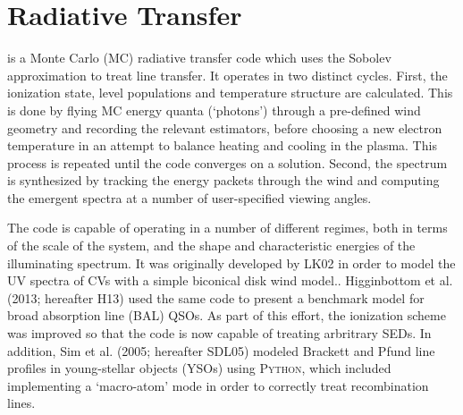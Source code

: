 \documentclass[preprint, a4paper, 11pt]{aastex}
\begin{document}









%
%

\section{Radiative Transfer}

\py is a Monte Carlo (MC) radiative transfer code which uses
the Sobolev approximation to treat line transfer. It operates 
in two distinct cycles. First, the ionization state, level populations
and temperature structure are calculated. This is done by
flying MC energy quanta (`photons') through a pre-defined wind geometry and recording
the relevant estimators, before choosing  a new electron temperature 
in an attempt to balance heating and cooling in the plasma.
This process is repeated until the code converges on a 
solution. Second, the spectrum is synthesized by tracking
the energy packets through the wind and computing the 
emergent spectra at a number of user-specified viewing angles.

The code is capable of operating in a number of different
regimes, both in terms of the scale of the system, and the 
shape and characteristic energies of the illuminating spectrum. 
It was originally developed by LK02 in order to model the UV spectra
of CVs with a simple biconical disk wind model.. 
Higginbottom et al.\nocite{higginbottom2013} (2013; hereafter H13) used the same code to
present a benchmark model for broad absorption line (BAL) QSOs.
As part of this effort, the ionization scheme was improved so that 
the code is now capable of treating arbritrary SEDs.
In addition, Sim et al. (2005; hereafter SDL05)\nocite{simmacro2005} modeled
Brackett and Pfund line profiles in young-stellar objects (YSOs) using \textsc{Python,} which included
implementing a `macro-atom' mode in order to correctly treat recombination lines.
\end{document}
